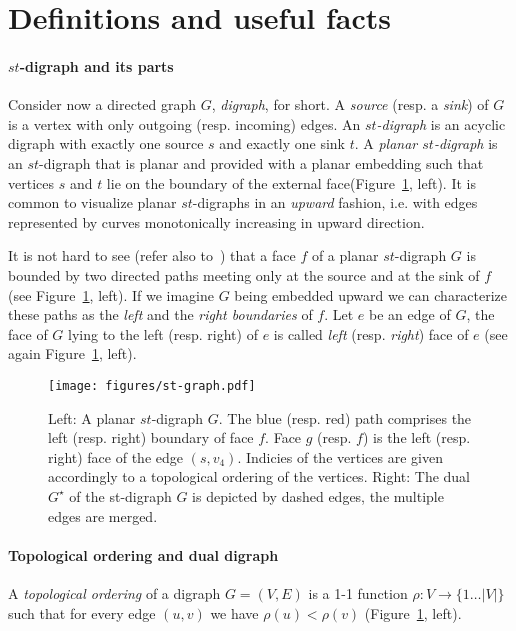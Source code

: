 \documentclass{llncs}
\begin{document}
\section{Definitions and useful facts}
\label{sec:definitions}

\paragraph{\bf $st$-digraph and its parts} Consider now a directed graph $G$, \emph{digraph}, for short. A \emph{source} (resp. a \emph{sink}) of  $G$ is a vertex with only outgoing  (resp. incoming) edges. An \emph{$st$-digraph} is an acyclic digraph with exactly one source $s$ and exactly one sink $t$. A \emph{planar $st$-digraph} is an $st$-digraph that is planar and provided with a planar embedding such that vertices $s$ and $t$ lie on the boundary of the external face(Figure~\ref{fig:st-digraph}, left).  It is common to visualize planar $st$-digraphs in an \emph{upward} fashion, i.e. with edges represented by curves monotonically increasing in upward direction. 

It is not hard to see (refer also to~\cite[Lemma~4.1]{diBattistaThebook}) that a face $f$ of a planar $st$-digraph $G$ is bounded by two directed paths meeting only at the source and at the sink of $f$ (see Figure~\ref{fig:st-digraph}, left).  If we imagine $G$ being embedded upward we can characterize these paths as the \emph{left} and the \emph{right  boundaries} of $f$. Let $e$ be an edge of $G$, the face of $G$ lying to the left (resp. right) of $e$ is called \emph{left} (resp. \emph{right}) face of $e$ (see again Figure~\ref{fig:st-digraph}, left). 


\begin{figure}[htb]
\centering
\texttt{[image: figures/st-graph.pdf]}
\caption{Left: A planar $st$-digraph $G$. The blue (resp. red) path comprises the left (resp. right) boundary of face $f$. Face $g$ (resp. $f$) is the left (resp. right) face of the edge $(s,v_4)$. Indicies of the vertices are given accordingly to a topological ordering of the vertices. Right: The dual $G^\star$ of the st-digraph $G$ is depicted by dashed edges, the multiple edges are merged. }
\label{fig:st-digraph}
\end{figure}


\paragraph{\bf Topological ordering and dual digraph} A \emph{topological ordering} of a digraph $G=(V,E)$  is a 1-1 function $\rho:V\rightarrow \{1\dots |V|\}$ such that for every edge $(u, v)$ we have $\rho(u)<\rho(v)$ (Figure~\ref{fig:st-digraph}, left).
\end{document}
